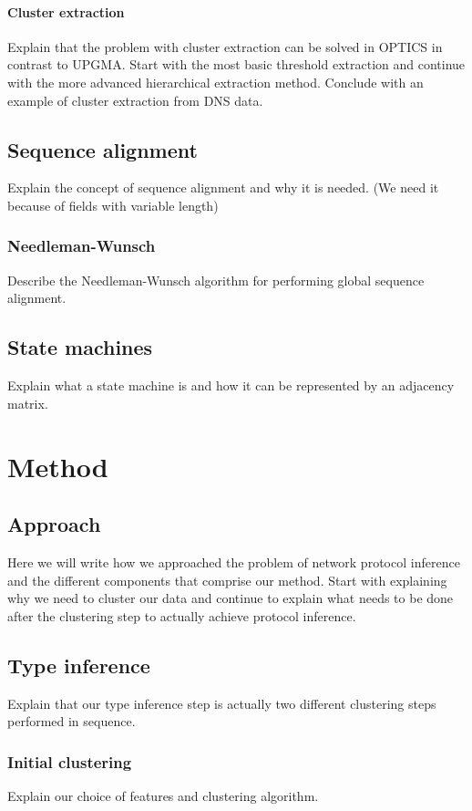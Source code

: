 \documentclass[a4paper]{report}
\begin{document}
\subsubsection{Cluster extraction}
Explain that the problem with cluster extraction can be solved in OPTICS in
contrast to UPGMA. Start with the most basic threshold extraction and continue
with the more advanced hierarchical extraction method. Conclude with an example
of cluster extraction from DNS data.

\section{Sequence alignment}
Explain the concept of sequence alignment and why it is needed. (We need it
because of fields with variable length)

\subsection{Needleman-Wunsch}
Describe the Needleman-Wunsch algorithm for performing global sequence
alignment.

\section{State machines}
Explain what a state machine is and how it can be represented by an adjacency
matrix.

\chapter{Method}

\section{Approach}
Here we will write how we approached the problem of network protocol inference
and the different components that comprise our method. Start with explaining
why we need to cluster our data and continue to explain what needs to be done
after the clustering step to actually achieve protocol inference.

\section{Type inference}
Explain that our type inference step is actually two different clustering steps
performed in sequence.

\subsection{Initial clustering}
Explain our choice of features and clustering algorithm.
\end{document}
